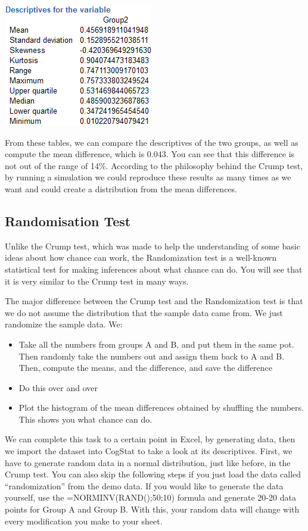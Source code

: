 \documentclass[
]{book}
\begin{document}
\includegraphics{img/ch5/5.3.4.1.5descrG2.png}

From these tables, we can compare the descriptives of the two groups, as well as compute the mean difference, which is 0.043. You can see that this difference is not out of the range of 14\%. According to the philosophy behind the Crump test, by running a simulation we could reproduce these results as many times as we want and could create a distribution from the mean differences.

\hypertarget{randomisation-test}{%
\subsection{Randomisation Test}\label{randomisation-test}}

Unlike the Crump test, which was made to help the understanding of some basic ideas about how chance can work, the Randomization test is a well-known statistical test for making inferences about what chance can do. You will see that it is very similar to the Crump test in many ways.

The major difference between the Crump test and the Randomization test is that we do not assume the distribution that the sample data came from. We just randomize the sample data. We:

\begin{itemize}
\item
  Take all the numbers from groups A and B, and put them in the same pot. Then randomly take the numbers out and assign them back to A and B. Then, compute the means, and the difference, and save the difference
\item
  Do this over and over
\item
  Plot the histogram of the mean differences obtained by shuffling the numbers. This shows you what chance can do.
\end{itemize}

We can complete this task to a certain point in Excel, by generating data, then we import the dataset into CogStat to take a look at its descriptives. First, we have to generate random data in a normal distribution, just like before, in the Crump test. You can also skip the following steps if you just load the data called ``randomization'' from the demo data. If you would like to generate the data yourself, use the =NORMINV(RAND();50;10) formula and generate 20-20 data points for Group A and Group B. With this, your random data will change with every modification you make to your sheet.
\end{document}
